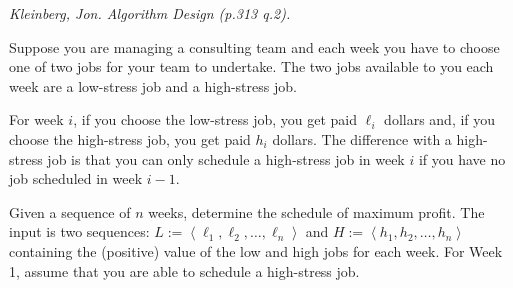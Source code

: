 \documentclass[solutionorbox,answers]{exam}
\begin{document}
\begin{questions}
\question \textit{Kleinberg, Jon. Algorithm Design (p.313 q.2).}

Suppose you are managing a consulting team and each week you have to choose one of two jobs for your team to undertake. The two jobs available to you each week are a low-stress job and a high-stress job.

For week $i$, if you choose the low-stress job, you get paid $\ell_i$ dollars and, if you choose the high-stress job, you get paid $h_i$ dollars. The difference with a high-stress job is that you can only schedule a high-stress job in week $i$ if you have no job scheduled in week $i-1$.

Given a sequence of $n$ weeks, determine the schedule of maximum profit. The input is two sequences: $L := \left<\ell_1,\ell_2,\ldots,\ell_n\right>$ and $H := \left<h_1,h_2,\ldots,h_n\right>$ containing the (positive) value of the low and high jobs for each week. For Week 1, assume that you are able to schedule a high-stress job.  

\end{questions}
\end{document}
